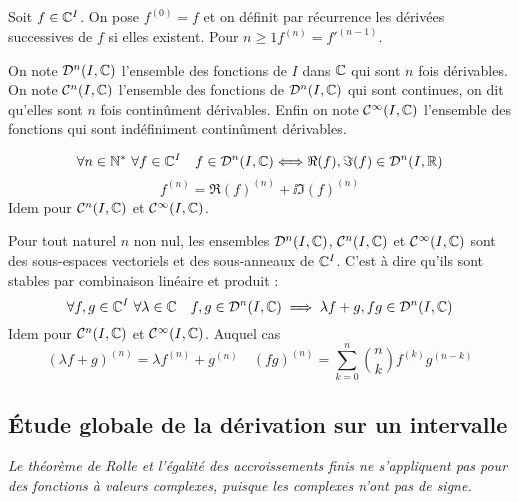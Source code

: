 \begin{defdef}
  Soit \(f \in \mathbb{C}^I\). On pose \(f^{(0)}=f\) et on définit par récurrence les 
  dérivées successives de \(f\) si elles existent. Pour \(n \geqslant 1 
  f^{(n)}=f'^{(n-1)}\).

  On note \(\mathcal{D}^n(I,\mathbb{C})\) l'ensemble des fonctions de \(I\) dans \(\mathbb{C}\) qui sont 
  \(n\) fois dérivables. On note \(\mathcal{C}^{n}(I,\mathbb{C})\) l'ensemble des fonctions 
  de \(\mathcal{D}^n(I,\mathbb{C})\)  qui sont continues, on dit qu'elles sont \(n\) fois 
  continûment dérivables. Enfin on note \(\mathcal{C}^{\infty}(I,\mathbb{C})\) l'ensemble des 
  fonctions qui sont indéfiniment continûment dérivables.
\end{defdef}
\begin{prop}
  \begin{equation}
    \forall n \in \mathbb{N}^* \ \forall f \in \mathbb{C}^I \quad f \in \mathcal{D}^{n}(I,\mathbb{C}) 
    \Longleftrightarrow \Re(f), \Im(f) \in \mathcal{D}^{n}(I,\mathbb{R})
  \end{equation}
  \begin{equation}
    f^{(n)}=\Re(f)^{(n)}+\ii\Im(f)^{(n)}
  \end{equation}
  Idem pour \(\mathcal{C}^{n}(I,\mathbb{C})\) et \(\mathcal{C}^{\infty}(I,\mathbb{C})\).
\end{prop}
\begin{prop}
  Pour tout naturel \(n\) non nul, les ensembles \(\mathcal{D}^{n}(I,\mathbb{C})\), 
  \(\mathcal{C}^{n}(I,\mathbb{C})\) et \(\mathcal{C}^{\infty}(I,\mathbb{C})\) sont des sous-espaces 
  vectoriels et des sous-anneaux de \(\mathbb{C}^I\). C'est à dire qu'ils sont stables 
  par combinaison linéaire et produit :
  \begin{equation}
    \forall f,g \in \mathbb{C}^I \ \forall \lambda \in \mathbb{C} \quad f,g \in \mathcal{D}^n(I,\mathbb{C}) 
    \implies \lambda f +g, fg \in \mathcal{D}^n(I,\mathbb{C})
  \end{equation}
  Idem pour \(\mathcal{C}^{n}(I,\mathbb{C})\) et \(\mathcal{C}^{\infty}(I,\mathbb{C})\). Auquel cas
  \begin{equation}
    (\lambda f +g)^{(n)}=\lambda f^{(n)} + g^{(n)} \quad (fg)^{(n)} = 
    \sum_{k=0}^n \binom{n}{k} f^{(k)}g^{(n-k)}
  \end{equation}
\end{prop}

\subsection{Étude globale de la dérivation sur un intervalle}

\emph{Le théorème de Rolle et l'égalité des accroissements finis ne s'appliquent 
pas pour des fonctions à valeurs complexes, puisque les complexes n'ont pas de 
signe.}

